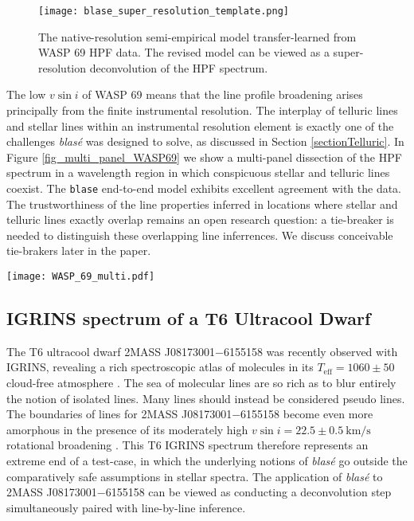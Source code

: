 \documentclass[trackchanges]{aastex631}
\begin{document}
\begin{figure}[hbt!]
    \centering
    \texttt{[image: blase\_super\_resolution\_template.png]}
    \caption{The native-resolution semi-empirical model transfer-learned from WASP 69 HPF data. The revised model can be viewed as a super-resolution deconvolution of the HPF spectrum.}
    \label{fig_WASP69_regularized}
\end{figure}


The low $v\sin{i}$ of WASP 69 means that the line profile broadening arises principally from the finite instrumental resolution.  The interplay of telluric lines and stellar lines within an instrumental resolution element is exactly one of the challenges  \emph{blas\'e} was designed to solve, as discussed in Section \ref{sectionTelluric}.  In Figure \ref{fig_multi_panel_WASP69} we show a multi-panel dissection of the HPF spectrum in a wavelength region in which conspicuous stellar and telluric lines coexist.  The  \texttt{blase} end-to-end model exhibits excellent agreement with the data.  The trustworthiness of the line properties inferred in locations where stellar and telluric lines exactly overlap remains an open research question: a tie-breaker is needed to distinguish these overlapping line inferrences.  We discuss conceivable tie-brakers later in the paper.

\begin{figure*}[hbt!]
    \centering
    \texttt{[image: WASP\_69\_multi.pdf]}
    \caption{End-to-end training on a portion of HPF spectrum of WASP-69. The top two panels show the cloning in from Step 1 of the visual guide.  The middle two panels depict the before-and-after of the instrument-convolved and resampled joint model illustrated in Step 4 of the visual guide.  The final two panels show the underlying semi-empirical models learned in the process.}
    \label{fig_multi_panel_WASP69}
\end{figure*}


\subsection{IGRINS spectrum of a T6 Ultracool Dwarf}

The T6 ultracool dwarf 2MASS J08173001$-$6155158 was recently observed with IGRINS, revealing a rich spectroscopic atlas of molecules in its $T_\mathrm{eff} = 1060 \pm 50$ cloud-free atmosphere \citep{2022MNRAS.tmp.1421T}.  The sea of molecular lines are so rich as to blur entirely the notion of isolated lines.  Many lines should instead be considered pseudo lines.  The boundaries of lines for 2MASS J08173001$-$6155158 become even more amorphous in the presence of its moderately high $v\sin{i} = 22.5\pm 0.5 ~ \text{km/s}$ rotational broadening \citep{2022MNRAS.tmp.1421T}.  This T6 IGRINS spectrum therefore represents an extreme end of a test-case, in which the underlying notions of \emph{blas\'e} go outside the comparatively safe assumptions in stellar spectra.  The application of  \emph{blas\'e} to 2MASS J08173001$-$6155158 can be viewed as conducting a deconvolution step simultaneously paired with line-by-line inference.
\end{document}
